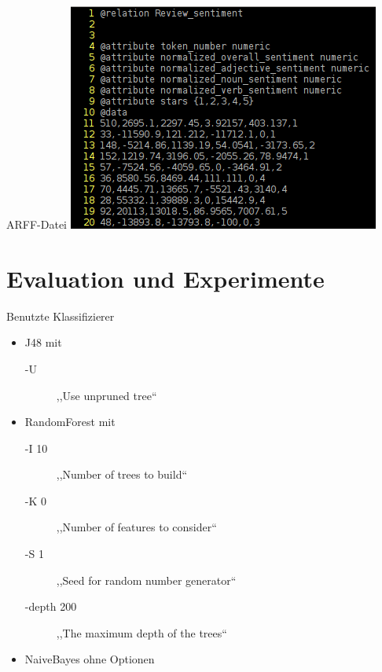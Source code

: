 \documentclass[note=hide]{beamer} %
\begin{document}
\begin{frame}{ARFF-Datei}
	\includegraphics[width=\textwidth]{arff_example_black.png}
\end{frame}

\section{Evaluation und Experimente}

\begin{frame}{Benutzte Klassifizierer}
	\begin{itemize}
		\item J48 mit 
			\begin{description}
				\item[-U] ,,Use unpruned tree``
			\end{description}
		\item RandomForest mit 
			\begin{description}
				\item[-I 10] ,,Number of trees to build``
				\item[-K 0] ,,Number of features to consider``
				\item[-S 1] ,,Seed for random number generator``
				\item[-depth 200] ,,The maximum depth of the trees``
			\end{description}
		\item NaiveBayes ohne Optionen
	\end{itemize}
\end{frame}
\end{document}
